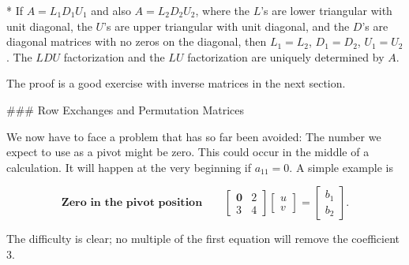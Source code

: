 * If \(A=L_{1}D_{1}U_{1}\) and also \(A=L_{2}D_{2}U_{2}\), where the \(L\)'s are lower triangular with unit diagonal, the \(U\)'s are upper triangular with unit diagonal, and the \(D\)'s are diagonal matrices with no zeros on the diagonal, then \(L_{1}=L_{2}\), \(D_{1}=D_{2}\), \(U_{1}=U_{2}\). The \(LDU\) factorization and the \(LU\) factorization are uniquely determined by \(A\).

The proof is a good exercise with inverse matrices in the next section.

### Row Exchanges and Permutation Matrices

We now have to face a problem that has so far been avoided: The number we expect to use as a pivot might be zero. This could occur in the middle of a calculation. It will happen at the very beginning if \(a_{11}=0\). A simple example is

\[\textbf{Zero in the pivot position}\qquad\begin{bmatrix}\textbf{0}&2\\ 3&4\end{bmatrix}\begin{bmatrix}u\\ v\end{bmatrix}=\begin{bmatrix}b_{1}\\ b_{2}\end{bmatrix}.\]

The difficulty is clear; no multiple of the first equation will remove the coefficient \(3\).

 